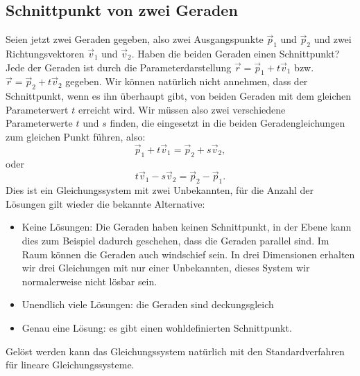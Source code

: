 \subsection{Schnittpunkt von zwei Geraden}
Seien jetzt zwei Geraden gegeben, also zwei Ausgangspunkte $\vec p_1$ und
$\vec p_2$ und zwei Richtungsvektoren $\vec v_1$ und $\vec v_2$.
Haben die beiden Geraden einen Schnittpunkt?
Jede der Geraden ist durch die Parameterdarstellung
$\vec r=\vec p_1+t\vec v_1$
bzw.~$\vec r=\vec p_2+t\vec v_2$
gegeben.
Wir können natürlich nicht annehmen, dass der Schnittpunkt,
wenn es ihn überhaupt gibt, von beiden Geraden mit dem gleichen Parameterwert
$t$ erreicht wird.
Wir müssen also zwei verschiedene Parameterwerte $t$
und $s$ finden, die eingesetzt in die beiden Geradengleichungen zum gleichen
Punkt führen, also:
\[
\vec p_1+t\vec v_1=\vec p_2+s\vec v_2,
\]
oder
\[
t\vec v_1-s\vec v_2=\vec p_2-\vec p_1.
\]
Dies ist ein Gleichungssystem mit zwei Unbekannten, für die Anzahl der Lösungen
gilt wieder die bekannte Alternative:
\begin{itemize}
\item Keine Lösungen: Die Geraden haben keinen Schnittpunkt, in der Ebene
kann dies zum Beispiel dadurch geschehen, dass die Geraden parallel sind.
Im Raum können die Geraden auch windschief sein.
In drei Dimensionen erhalten wir drei Gleichungen mit nur einer Unbekannten,
dieses System wir normalerweise nicht lösbar sein.
\item Unendlich viele Lösungen: die Geraden sind deckungsgleich
\item Genau eine Lösung: es gibt einen wohldefinierten Schnittpunkt.
\end{itemize}
Gelöst werden kann das Gleichungssystem natürlich mit den Standardverfahren
für lineare Gleichungssysteme.

